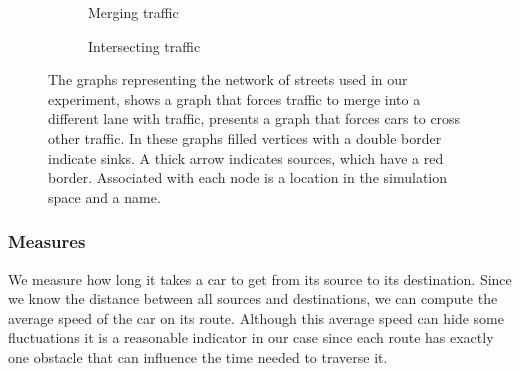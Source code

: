 \begin{figure}
	\centering
	\begin{subfigure}{0.49\textwidth}
		\centering
		
		\caption{Merging traffic}
		\label{fig:method:experiment:merging}
	\end{subfigure}
	\begin{subfigure}{0.49\textwidth}
		\centering
		
		\caption{Intersecting traffic}
		\label{fig:method:experiment:intersection}
	\end{subfigure}	
	\caption{The graphs representing the network of streets used in our experiment,  shows a graph that forces traffic to merge into a different lane with traffic,  presents a graph that forces cars to cross other traffic. In these graphs filled vertices with a double border indicate sinks. A thick arrow indicates sources, which have a red border. Associated with each node is a location in the simulation space and a name.}
	\label{fig:method:experimentGraphs}
\end{figure}

\subsubsection{Measures}
\label{ss:method:experiment:measures}
We measure how long it takes a car to get from its source to its destination. Since we know the distance between all sources and destinations, we can compute the average speed of the car on its route. Although this average speed can hide some fluctuations it is a reasonable indicator in our case since each route has exactly one obstacle that can influence the time needed to traverse it. 